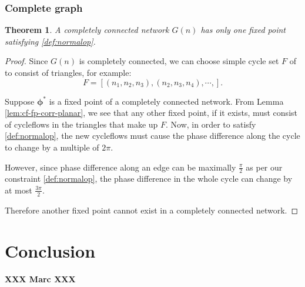\documentclass[10pt,aps,pra,onecolumn,superscriptaddress]{revtex4-1}
\renewcommand{\vec}[1]{\boldsymbol{#1}}
\newtheorem{theorem}{Theorem}
\begin{document}
\subsubsection{Complete graph}
\begin{theorem}
\label{}
A completely connected network $G(n)$ has only one fixed point satisfying 
\eqref{def:normalop}. 
\end{theorem}

\begin{proof}
Since $G(n)$ is completely connected, we can choose simple cycle set $F$ of to 
consist of triangles, for example:
\[
F=[(n_1, n_2, n_3), (n_2,n_3,n_4),\cdots, ].
\]

Suppose $\vec{\phi^*}$ is a fixed point of a completely connected network.   
From Lemma \ref{lem:cf-fp-corr-planar}, we see that any other fixed point, if 
it exists, must consist of cycleflows in the triangles that make up $F$.   
Now, in order to satisfy \eqref{def:normalop}, the new cycleflows must cause the 
phase difference along the cycle to change by a multiple of $2\pi$.  

However, since phase difference along an edge can be maximally $\frac{\pi}{2}$ 
as per our constraint \eqref{def:normalop}, the phase difference in the whole 
cycle can change by at most $\frac{3\pi}{2}$.   

Therefore another fixed point cannot exist in a completely connected network.  
\end{proof}



\section{Conclusion}



\textbf{XXX Marc XXX}







\end{document}
